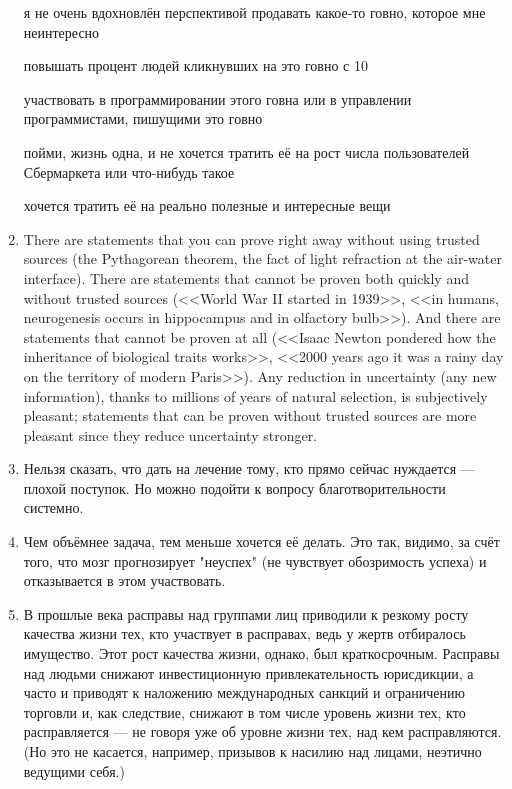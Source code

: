 \documentclass[11pt]{article}
\theoremstyle{remark}
\theoremstyle{definition}
\begin{document}
\begin{enumerate}
я не очень вдохновлён перспективой продавать какое-то говно, которое мне неинтересно

повышать процент людей кликнувших на это говно с 10%

участвовать в программировании этого говна или в управлении программистами, пишущими это говно

пойми, жизнь одна, и не хочется тратить её на рост числа пользователей Сбермаркета или что-нибудь такое

хочется тратить её на реально полезные и интересные вещи

\item There are statements that you can prove right away without using trusted sources (the Pythagorean theorem, the fact of light refraction at the air-water interface). There are statements that cannot be proven both quickly and without trusted sources (<<World War II started in 1939>>, <<in humans, neurogenesis occurs in hippocampus and in olfactory bulb>>). And there are statements that cannot be proven at all (<<Isaac Newton pondered how the inheritance of biological traits works>>, <<2000 years ago it was a rainy day on the territory of modern Paris>>). Any reduction in uncertainty (any new information), thanks to millions of years of natural selection, is subjectively pleasant; statements that can be proven without trusted sources are more pleasant since they reduce uncertainty stronger.

\item Нельзя сказать, что дать на лечение тому, кто прямо сейчас нуждается --- плохой поступок. Но можно подойти к вопросу благотворительности системно.


\item Чем объёмнее задача, тем меньше хочется её делать. Это так, видимо, за счёт того, что мозг прогнозирует "неуспех" (не чувствует обозримость успеха) и отказывается в этом участвовать.



\item В прошлые века расправы над группами лиц приводили к резкому росту качества жизни тех, кто участвует в расправах, ведь у жертв отбиралось имущество. Этот рост качества жизни, однако, был краткосрочным. Расправы над людьми снижают инвестиционную привлекательность юрисдикции, а часто и приводят к наложению международных санкций и ограничению торговли и, как следствие, снижают в том числе уровень жизни тех, кто расправляется --- не говоря уже об уровне жизни тех, над кем расправляются. (Но это не касается, например, призывов к насилию над лицами, неэтично ведущими себя.)


\end{enumerate}
\end{document}
